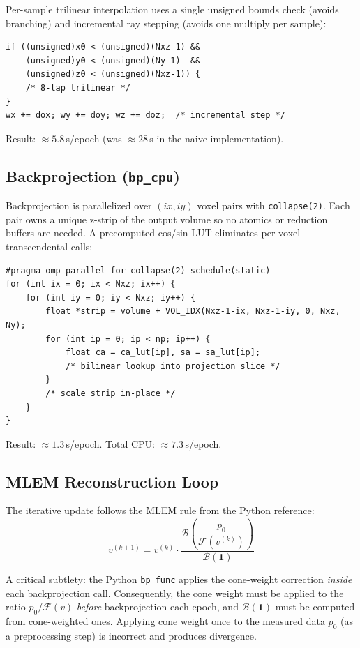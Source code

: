 \documentclass[11pt,a4paper]{article}
\begin{document}
Per-sample trilinear interpolation uses a single unsigned bounds check (avoids
branching) and incremental ray stepping (avoids one multiply per sample):
\begin{lstlisting}
if ((unsigned)x0 < (unsigned)(Nxz-1) &&
    (unsigned)y0 < (unsigned)(Ny-1)  &&
    (unsigned)z0 < (unsigned)(Nxz-1)) {
    /* 8-tap trilinear */
}
wx += dox; wy += doy; wz += doz;  /* incremental step */
\end{lstlisting}

Result: $\approx 5.8$\,s/epoch (was $\approx 28$\,s in the naive implementation).

\subsection{Backprojection (\texttt{bp\_cpu})}

Backprojection is parallelized over $(ix, iy)$ voxel pairs with
\texttt{collapse(2)}. Each pair owns a unique z-strip of the output volume so no
atomics or reduction buffers are needed. A precomputed cos/sin LUT eliminates
per-voxel transcendental calls:

\begin{lstlisting}
#pragma omp parallel for collapse(2) schedule(static)
for (int ix = 0; ix < Nxz; ix++) {
    for (int iy = 0; iy < Nxz; iy++) {
        float *strip = volume + VOL_IDX(Nxz-1-ix, Nxz-1-iy, 0, Nxz, Ny);
        for (int ip = 0; ip < np; ip++) {
            float ca = ca_lut[ip], sa = sa_lut[ip];
            /* bilinear lookup into projection slice */
        }
        /* scale strip in-place */
    }
}
\end{lstlisting}

Result: $\approx 1.3$\,s/epoch. Total CPU: $\approx 7.3$\,s/epoch.

\subsection{MLEM Reconstruction Loop}

The iterative update follows the MLEM rule from the Python reference:
\[
v^{(k+1)} = v^{(k)} \cdot \frac{\mathcal{B}\!\left(\dfrac{p_0}{\mathcal{F}(v^{(k)})}\right)}{\mathcal{B}(\mathbf{1})}
\]

A critical subtlety: the Python \texttt{bp\_func} applies the cone-weight
correction \emph{inside} each backprojection call. Consequently, the cone weight
must be applied to the ratio $p_0 / \mathcal{F}(v)$ \emph{before} backprojection
each epoch, and $\mathcal{B}(\mathbf{1})$ must be computed from cone-weighted ones.
Applying cone weight once to the measured data $p_0$ (as a preprocessing step) is
incorrect and produces divergence.
\end{document}
